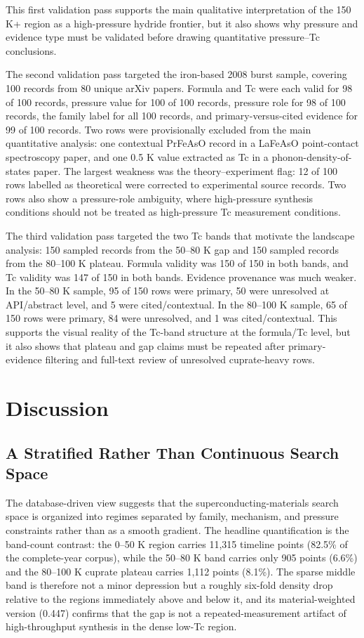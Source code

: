 \documentclass[11pt]{article}
\begin{document}
This first validation pass supports the main qualitative interpretation of the 150 K+ region as a high-pressure hydride frontier, but it also shows why pressure and evidence type must be validated before drawing quantitative pressure--Tc conclusions.

The second validation pass targeted the iron-based 2008 burst sample, covering 100 records from 80 unique arXiv papers. Formula and Tc were each valid for 98 of 100 records, pressure value for 100 of 100 records, pressure role for 98 of 100 records, the family label for all 100 records, and primary-versus-cited evidence for 99 of 100 records. Two rows were provisionally excluded from the main quantitative analysis: one contextual PrFeAsO record in a LaFeAsO point-contact spectroscopy paper, and one 0.5 K value extracted as Tc in a phonon-density-of-states paper. The largest weakness was the theory--experiment flag: 12 of 100 rows labelled as theoretical were corrected to experimental source records. Two rows also show a pressure-role ambiguity, where high-pressure synthesis conditions should not be treated as high-pressure Tc measurement conditions.

The third validation pass targeted the two Tc bands that motivate the landscape analysis: 150 sampled records from the 50--80 K gap and 150 sampled records from the 80--100 K plateau. Formula validity was 150 of 150 in both bands, and Tc validity was 147 of 150 in both bands. Evidence provenance was much weaker. In the 50--80 K sample, 95 of 150 rows were primary, 50 were unresolved at API/abstract level, and 5 were cited/contextual. In the 80--100 K sample, 65 of 150 rows were primary, 84 were unresolved, and 1 was cited/contextual. This supports the visual reality of the Tc-band structure at the formula/Tc level, but it also shows that plateau and gap claims must be repeated after primary-evidence filtering and full-text review of unresolved cuprate-heavy rows.

\section{Discussion}

\subsection{A Stratified Rather Than Continuous Search Space}

The database-driven view suggests that the superconducting-materials search space is organized into regimes separated by family, mechanism, and pressure constraints rather than as a smooth gradient. The headline quantification is the band-count contrast: the 0--50 K region carries 11{,}315 timeline points (82.5\% of the complete-year corpus), while the 50--80 K band carries only 905 points (6.6\%) and the 80--100 K cuprate plateau carries 1{,}112 points (8.1\%). The sparse middle band is therefore not a minor depression but a roughly six-fold density drop relative to the regions immediately above and below it, and its material-weighted version (0.447) confirms that the gap is not a repeated-measurement artifact of high-throughput synthesis in the dense low-Tc region.
\end{document}
